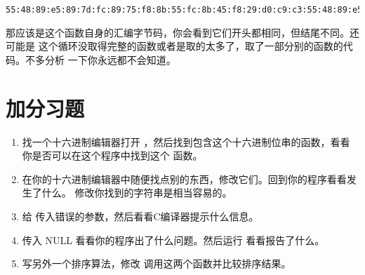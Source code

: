 \begin{Verbatim}
55:48:89:e5:89:7d:fc:89:75:f8:8b:55:fc:8b:45:f8:29:d0:c9:c3:55:48:89:e5:89:
\end{Verbatim}

那应该是这个函数自身的汇编字节码，你会看到它们开头都相同，但结尾不同。还可能是
这个循环没取得完整的函数或者是取的太多了，取了一部分别的函数的代码。不多分析
一下你永远都不会知道。

\section{加分习题}

\begin{enumerate}
\item 找一个十六进制编辑器打开 ，然后找到包含这个十六进制位串的函数，看看你是否可以在这个程序中找到这个
函数。
\item 在你的十六进制编辑器中随便找点别的东西，修改它们。回到你的程序看看发生了什么。
    修改你找到的字符串是相当容易的。
\item 给  传入错误的参数，然后看看C编译器提示什么信息。
\item 传入 NULL 看看你的程序出了什么问题。然后运行  看看报告了什么。
\item 写另外一个排序算法，修改  调用这两个函数并比较排序结果。
\end{enumerate}


